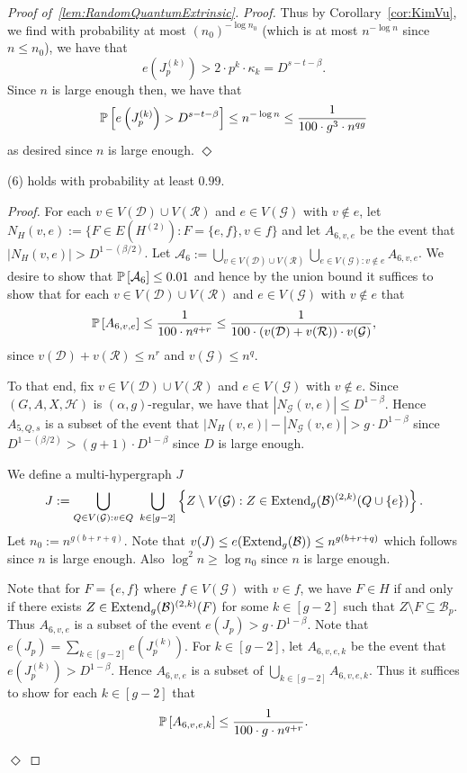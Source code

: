 \documentclass[11pt]{article}
\newcommand{\mc}[1]{\mathcal{#1}}
\newcounter{i}
\theoremstyle{plain}
\newenvironment{proofclaim}[1][]%
{\noindent \emph{Proof.} {}{#1}{}}{\hfill
	$\Diamond$\vspace{1em}}
\renewcommand{\theclaim}{\thetheorem.\arabic{claim}}
\newenvironment{lateproof}[1]
 {%
  \renewcommand{\theclaim}{\ref{#1}.\arabic{claim}}%
  \begin{proof}[Proof of~\cref{#1}]%
 }
 {\end{proof}}
\theoremstyle{plain} %
\theoremstyle{definition}
\newcommand{\Prob}[1]{\ensuremath{%
\mathbb P\left[#1\right]
}}
\begin{document}
\begin{lateproof}{lem:RandomQuantumExtrinsic}
\begin{proofclaim}
Thus by Corollary~\ref{cor:KimVu}, we find with probability at most
$(n_0)^{-\log n_0}$ (which is at most $n^{-\log n}$ since $n\le n_0$), we have that
$$e\left(J^{(k)}_p\right) > 2\cdot p^k\cdot \kappa_k = D^{s-t-\beta}.$$ 
Since $n$ is large enough then, we have that
$$\Prob{e\left(J^{(k)}_p\right) > D^{s-t-\beta} }\le n^{-\log n} \le  \frac{1}{100\cdot g^3\cdot n^{qg}}$$
as desired since $n$ is large enough.
\end{proofclaim}

\begin{claim}\label{cl:10Holds}
(6) holds with probability at least $0.99$.    
\end{claim}
\begin{proofclaim}
For each $v\in V(\mc{D})\cup V(\mc{R})$ and $e\in V(\mc{G})$ with $v\not\in e$, let $N_{H}(v,e):= \{ F\in E(H^{(2)}): F=\{e,f\}, v\in f\}$ and let $A_{6,v,e}$ be the event that $|N_H(v,e)| > D^{1-(\beta/2)}$.
Let $\mathcal{A}_6 := \bigcup_{v\in V(\mc{D})\cup V(\mc{R})} \bigcup_{e\in V(\mc{G}): v\not\in e} A_{6,v,e}$. We desire to show that $\Prob{\mc{A}_6} \le 0.01$ and hence by the union bound it suffices to show that for each $v\in V(\mc{D})\cup V(\mc{R})$ and $e\in V(\mc{G})$ with $v\not\in e$  that
$$\Prob{A_{6,v,e}} \le \frac{1}{100\cdot n^{q+r}} \le \frac{1}{100 \cdot (v(\mc{D})+v(\mc{R}))\cdot v(\mc{G})},$$
since $v(\mc{D})+v(\mc{R})\le n^r$ and $v(\mc{G})\le n^q$.

To that end, fix $v\in V(\mc{D})\cup V(\mc{R})$ and $e\in V(\mc{G})$ with $v\not\in e$. Since $(G,A,X,\mc{H})$ is $(\alpha,g)$-regular, we have that  $|N_{\mc{G}}(v,e)| \le D^{1-\beta}$. Hence $A_{5,Q,s}$ is a subset of the event that $|N_{H}(v,e)| - |N_{\mc{G}}(v,e)| > g\cdot D^{1-\beta}$ since $D^{1-(\beta/2)} > (g+1)\cdot D^{1-\beta}$ since $D$ is large enough. 

We define a multi-hypergraph $J$ 
$$J:= \bigcup_{Q\in V(\mc{G}): v\in Q}~\bigcup_{k\in [g-2]} \left\{ Z\setminus V(\mc{G}): Z\in{\rm Extend}_g(\mc{B})^{(2,k)}(Q\cup \{e\})\right\}.$$
Let $n_0:= n^{g(b+r+q)}$. Note that $v(J) \le e({\rm Extend}_g(\mc{B})) \le n^{g(b+r+q)}$ which follows since $n$ is large enough. Also $\log^2 n\ge \log n_0$ since $n$ is large enough.

Note that for $F=\{e,f\}$ where $f\in V(\mc{G})$ with $v\in f$, we have $F\in H$ if and only if there exists $Z\in{\rm Extend}_g(\mc{B})^{(2,k)}(F)$ for some $k\in [g-2]$ such that $Z\setminus F\subseteq \mc{B}_p$. Thus $A_{6,v,e}$ is a subset of the event $e(J_p) > g\cdot D^{1-\beta}$.
Note that $e(J_p) = \sum_{k\in [g-2]} e\left(J^{(k)}_p\right)$. For $k\in [g-2]$, let $A_{6,v,e,k}$ be the event that $e\left(J^{(k)}_p\right) > D^{1-\beta}$. Hence $A_{6,v,e}$ is a subset of $\bigcup_{k \in [g-2]} A_{6,v,e,k}$. Thus it suffices to show for each  $k\in [g-2]$ that
$$\Prob{A_{6,v,e,k}} \le \frac{1}{100\cdot g \cdot n^{q+r}}.$$


\end{proofclaim}
\end{lateproof}
\end{document}
